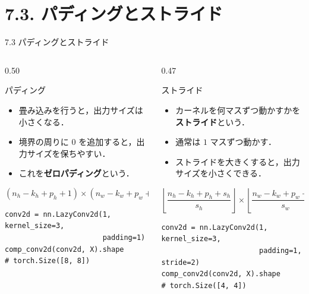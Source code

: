 \documentclass[dvipdfmx,uplatex,unicode,9pt,aspectratio=169]{beamer}
\begin{document}
\section{7.3. パディングとストライド}
\begin{frame}[fragile]{7.3 パディングとストライド}
\begin{columns}[T,onlytextwidth]
\begin{column}{0.50\textwidth}
\begin{block}{パディング}
\begin{itemize}
\item 畳み込みを行うと，出力サイズは小さくなる．
\item 境界の周りに $0$ を追加すると，出力サイズを保ちやすい．
\item これを\textbf{ゼロパディング}という．
\end{itemize}
\[
(n_h-k_h+p_h+1)
\times
(n_w-k_w+p_w+1)
\]
\end{block}

\begin{lstlisting}
conv2d = nn.LazyConv2d(1, kernel_size=3,
                       padding=1)
comp_conv2d(conv2d, X).shape
# torch.Size([8, 8])
\end{lstlisting}
\end{column}

\begin{column}{0.47\textwidth}
\begin{block}{ストライド}
\begin{itemize}
\item カーネルを何マスずつ動かすかを\textbf{ストライド}という．
\item 通常は $1$ マスずつ動かす．
\item ストライドを大きくすると，出力サイズを小さくできる．
\end{itemize}
\[
\left\lfloor
\frac{n_h-k_h+p_h+s_h}{s_h}
\right\rfloor
\times
\left\lfloor
\frac{n_w-k_w+p_w+s_w}{s_w}
\right\rfloor
\]
\end{block}

\begin{lstlisting}
conv2d = nn.LazyConv2d(1, kernel_size=3,
                       padding=1, stride=2)
comp_conv2d(conv2d, X).shape
# torch.Size([4, 4])
\end{lstlisting}
\end{column}
\end{columns}
\end{frame}
\end{document}
